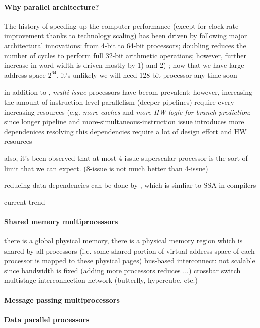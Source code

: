 \documentclass{memo}
\begin{document}
\small
{}

\paragraph{Why parallel architecture?}
The history of speeding up the computer performance (except for clock rate
improvement thanks to technology scaling) has been driven by following major
architectural innovations:
\bit
\w {} from 4-bit to 64-bit processors; doubling
 reduces the number of cycles to perform full 32-bit
arithmetic operations; however, further increase in word width is driven
mostly by 1)  and 2) ; now that we have large address space $2^{64}$, it's unlikely
we will need 128-bit processor any time soon

in addition to , {\em multi-issue\/} 
processors have becom prevalent; however, increasing the amount of
instruction-level parallelism (deeper pipelines) require every increasing
resources (e.g. {\em more caches\/} and {\em more HW logic for branch
  prediction\/}; since longer pipeline and more-simultaneous-instruction issue
introduces more dependenices resolving this dependencies require a lot of
design effort and HW resources

also, it's been observed that at-most 4-issue superscalar processor is the
sort of limit that we can expect. (8-issue is not much better than 4-issue)

reducing data dependencies can be done by , which is simliar to
SSA in compilers

\w {} current trend
\eit

\paragraph{Shared memory multiprocessors}
\bit
\w there is a global physical memory, there is a physical memory region which
is shared by all processors (i.e. some shared portion of virtual address space
of each processor is mapped to these physical pages)
\w {}
\bit
\w bus-based interconnect: not scalable since bandwidth is fixed (adding more
processors reduces ...)
\w crossbar switch
\w multistage interconnection network (butterfly, hypercube, etc.)
\eit
\w {}
\eit

\paragraph{Message passing multiprocessors}

\paragraph{Data parallel processors}
\end{document}
